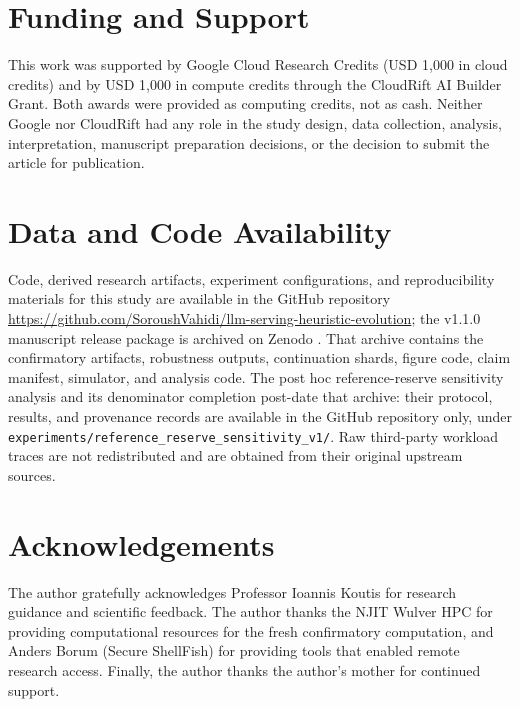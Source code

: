 \documentclass[preprint,12pt]{elsarticle}
\begin{document}
\section*{Funding and Support}
This work was supported by Google Cloud Research Credits (USD 1,000 in cloud credits) and by USD 1,000 in compute credits through the CloudRift AI Builder Grant. Both awards were provided as computing credits, not as cash. Neither Google nor CloudRift had any role in the study design, data collection, analysis, interpretation, manuscript preparation decisions, or the decision to submit the article for publication.

\section*{Data and Code Availability}
{\leavevmode\raggedright Code, derived research artifacts, experiment configurations, and reproducibility materials for this study are available in the GitHub repository \url{https://github.com/SoroushVahidi/llm-serving-heuristic-evolution}; the v1.1.0 manuscript release package is archived on Zenodo \cite{vahidi2026archive}. That archive contains the confirmatory artifacts, robustness outputs, continuation shards, figure code, claim manifest, simulator, and analysis code. The post hoc reference-reserve sensitivity analysis and its denominator completion post-date that archive: their protocol, results, and provenance records are available in the GitHub repository only, under \texttt{experiments/reference\_reserve\_sensitivity\_v1/}. Raw third-party workload traces are not redistributed and are obtained from their original upstream sources.\par}

\section*{Acknowledgements}
The author gratefully acknowledges Professor Ioannis Koutis for research guidance and scientific feedback. The author thanks the NJIT Wulver HPC for providing computational resources for the fresh confirmatory computation, and Anders Borum (Secure ShellFish) for providing tools that enabled remote research access. Finally, the author thanks the author's mother for continued support.



{\raggedright

}
\end{document}
